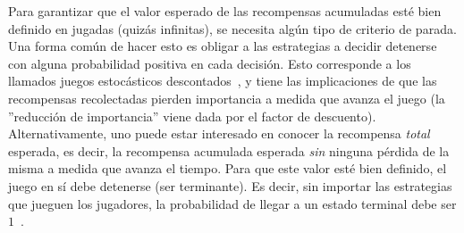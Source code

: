         Para garantizar que el valor esperado de las recompensas acumuladas esté bien definido en jugadas (quizás infinitas), se necesita algún tipo de criterio de parada. Una forma común de hacer esto es obligar a las estrategias a decidir detenerse con alguna probabilidad positiva en cada decisión. Esto corresponde a los llamados juegos estocásticos descontados~\cite{Shapley1095,FilarV96}, y tiene las implicaciones de que las recompensas recolectadas pierden importancia a medida que avanza el juego (la ''reducción de importancia'' viene dada por el factor de descuento). Alternativamente, uno puede estar interesado en conocer la recompensa \emph{total} esperada, es decir, la recompensa acumulada esperada \emph{sin} ninguna pérdida de la misma a medida que avanza el tiempo. Para que este valor esté bien definido, el juego en sí debe detenerse (ser terminante). Es decir, sin importar las estrategias que jueguen los jugadores, la probabilidad de llegar a un estado terminal debe ser $1$~\cite{Condon90,FilarV96}.
